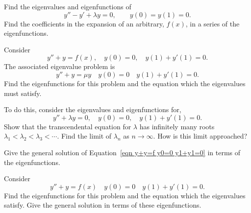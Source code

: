 {%
\begin{Exercise}
  \label{exercise y''-y'+ly=0}
  Find the eigenvalues and eigenfunctions of
  \[ 
  y'' - y' + \lambda y = 0, \qquad y(0) = y(1) = 0. 
  \]
  Find the coefficients in the expansion of an arbitrary, $f(x)$, in a series
  of the eigenfunctions.

\end{Exercise}






\begin{Exercise}
  \label{exercise y''+ly=0 y+y'=0}
  Consider 
  \begin{equation}
    \label{eqn y+y=f y0=0 y1+y1=0}
    y'' + y = f(x), \quad y(0) = 0, \quad y(1) + y'(1) = 0.
  \end{equation}
  The associated eigenvalue problem is
  \[
  y'' + y = \mu y  \quad y(0) = 0 \quad y(1) + y'(1) = 0.
  \]
  Find the eigenfunctions for this problem and the equation which the
  eigenvalues must satisfy. 

  To do this, consider the eigenvalues and eigenfunctions for,
  \[
  y'' + \lambda y = 0, \quad y(0) = 0, \quad y(1) + y'(1) = 0.
  \]
  Show that the transcendental equation for $\lambda$ has infinitely many 
  roots $\lambda_1 < \lambda_2 < \lambda_3 < \cdots$.  Find the limit of
  $\lambda_n$ as $n \to \infty$.  How is this limit approached?

  Give the general solution of Equation~\ref{eqn y+y=f y0=0 y1+y1=0}
  in terms of the eigenfunctions.

\end{Exercise}







\begin{Exercise}
  \label{exercise y''+y=f y+y'=0}
  Consider
  \[ 
  y'' +  y = f(x)  \quad y(0) = 0 \quad y(1) + y'(1) = 0.
  \] 
  Find the eigenfunctions for this problem and the equation which the
  eigenvalues satisfy. Give the general solution in terms of these
  eigenfunctions.

\end{Exercise}





}
